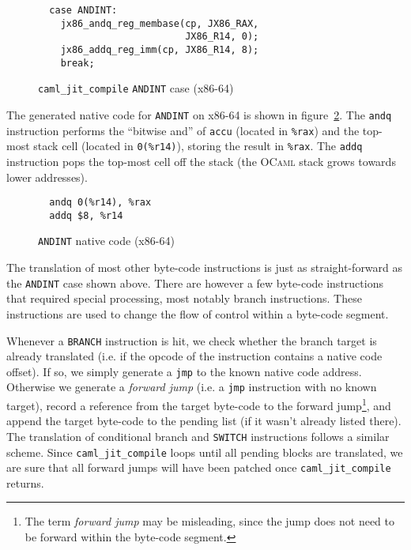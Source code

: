 \documentclass[a4paper]{acm_proc_article-sp}
\begin{document}
\begin{figure}[ht]
  \centering
  \begin{verbatim}
  case ANDINT:
    jx86_andq_reg_membase(cp, JX86_RAX,
                          JX86_R14, 0);
    jx86_addq_reg_imm(cp, JX86_R14, 8);
    break;
\end{verbatim}
  \caption{\texttt{caml\_jit\_compile} \texttt{ANDINT} case (x86-64)}
  \label{figure:caml_jit_compile_ANDINT}
\end{figure}

The generated native code for \texttt{ANDINT} on x86-64 is shown in figure~\ref{figure:ANDINT_native_code}.
The \texttt{andq} instruction performs the ``bitwise and'' of \texttt{accu} (located in \texttt{\%rax}) and
the top-most stack cell (located in \texttt{0(\%r14)}), storing the result in \texttt{\%rax}. The \texttt{addq}
instruction pops the top-most cell off the stack (the \textsc{OCaml} stack grows towards lower addresses).

\begin{figure}[ht]
  \centering
  \begin{verbatim}
  andq 0(%r14), %rax
  addq $8, %r14
\end{verbatim}
  \caption{\texttt{ANDINT} native code (x86-64)}
  \label{figure:ANDINT_native_code}
\end{figure}

The translation of most other byte-code instructions is just as straight-forward as
the \texttt{ANDINT} case shown above. There are however a few byte-code instructions that
required special processing, most notably branch instructions. These instructions are used
to change the flow of control within a byte-code segment.

Whenever a \texttt{BRANCH} instruction is hit, we check whether the branch target is already
translated (i.e. if the opcode of the instruction contains a native code offset). If so, we
simply generate a \texttt{jmp} to the known native code address.
Otherwise we generate a \emph{forward jump} (i.e. a \texttt{jmp} instruction with no known
target), record a reference from the target byte-code to the forward jump\footnote{The
term \emph{forward jump} may be misleading, since the jump does not need to be forward
within the byte-code segment.}, and append the target byte-code to the pending list
(if it wasn't already listed there). The translation of conditional branch and \texttt{SWITCH}
instructions follows a similar scheme. Since \texttt{caml\_jit\_compile}
loops until all pending blocks are translated, we are sure that all forward jumps will
have been patched once \texttt{caml\_jit\_compile} returns.
\end{document}
